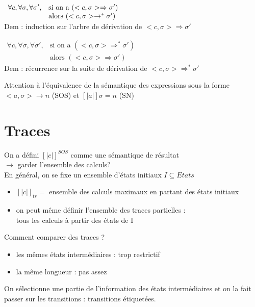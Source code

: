 \documentclass[10pt,a4paper]{article}
\newcommand{\semm}[1]{\left[| #1 | \right]}
\begin{document}
\begin{lem}{1} 
$ \begin{array}{l l}
\forall c, \forall \sigma, \forall \sigma', & \text{si on a }(<c, \sigma> \Rightarrow \sigma')\\
											& \text{alors } (<c, \sigma> \rightarrow^* \sigma')
\end{array}$\\
Dem : induction sur l'arbre de dérivation de $<c, \sigma> \Rightarrow \sigma'$\\
\end{lem}

\begin{lem}{2} 
$ \begin{array}{ll}
\forall c, \forall \sigma, \forall \sigma', &\text{si on a }(<c, \sigma> \Rightarrow^* \sigma')\\
											& \text{alors } (<c, \sigma> \Rightarrow \sigma')
\end{array}$\\
Dem : récurrence sur la suite de dérivation de $<c, \sigma> \Rightarrow^* \sigma'$\\
\end{lem}

\begin{rem}{}Attention à l'équivalence de la sémantique des expressions sous la forme $<a, \sigma> \rightarrow n$ (SOS) et $\semm{a} \sigma = n$ (SN)\\
\end{rem}

\part{Traces}
On a défini $\semm{c}^{SOS}$ comme une sémantique de résultat\\
$\longrightarrow$ garder l'ensemble des calculs?\\
En général, on se fixe un ensemble d'états initiaux $I \subseteq Etats$
\begin{itemize}
\item $\semm{c}_{tr} = $ ensemble des calculs maximaux en partant des états initiaux
\item on peut m\^eme définir l'ensemble des traces partielles : \\
tous les calculs à partir des états de I
\end{itemize}

Comment comparer des traces ? \begin{itemize}
\item les m\^emes états intermédiaires : trop restrictif
\item la m\^eme longueur : pas assez
\end{itemize}
On sélectionne une partie de l'information des états intermédiaires et on la fait passer sur les transitions : transitions étiquetées.
\end{document}
